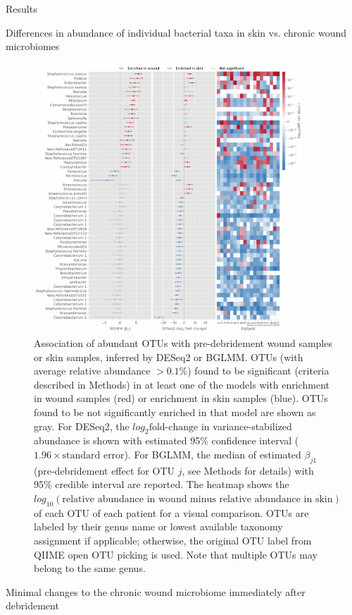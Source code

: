 \documentclass[oneside,12pt,final]{sty/ucthesis-CA2012}
\begin{document}
\begin{mainmatter}
\begin{section}{Results}
\begin{subsection}{Differences in abundance of individual bacterial taxa in skin vs. chronic wound microbiomes}
\begin{figure}
\centerline{\includegraphics[width=0.9\textwidth]{fig/C3fig2.pdf}}
\caption{Association of abundant OTUs with pre-debridement wound samples or skin samples, inferred by DESeq2 or BGLMM. OTUs (with average relative abundance $>0.1$\%) found to be significant (criteria described in Methods) in at least one of the models with enrichment in wound samples (red) or enrichment in skin samples (blue). OTUs found to be not significantly enriched in that model are shown as gray. For DESeq2, the $log_{2}\text{fold-change}$ in variance-stabilized abundance is shown with estimated 95\% confidence interval ($1.96 \times \text{standard error}$). For BGLMM, the median of estimated $\beta_{j1}$ (pre-debridement effect for OTU $j$, see Methods for details) with 95\% credible interval are reported. The heatmap shows the $log_{10}(\text{relative abundance in wound minus relative abundance in skin})$ of each OTU of each patient for a visual comparison. OTUs are labeled by their genus name or lowest available taxonomy assignment if applicable; otherwise, the original OTU label from QIIME open OTU picking is used. Note that multiple OTUs may belong to the same genus.}
\label{fig:fig2}
\end{figure}

\end{subsection}

\begin{subsection}{Minimal changes to the chronic wound microbiome immediately after debridement}


\end{subsection}
\end{section}
\end{mainmatter}
\end{document}
